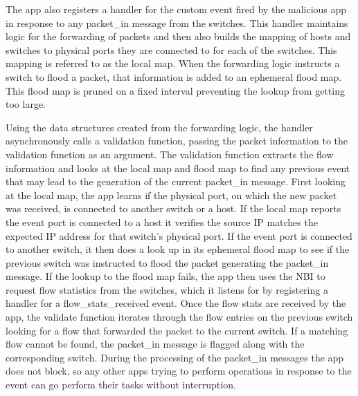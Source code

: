 The app also registers a handler for the custom event fired by the 
malicious app in response to any packet\_in message from the switches. 
This handler maintains logic for the forwarding of packets and then also
builds the mapping of hosts and switches to physical ports they are 
connected to for each of the switches. This mapping is referred to as 
the local map. When the forwarding logic instructs a switch to flood a
packet, that information is added to an ephemeral flood map. This flood
map is pruned on a fixed interval preventing the lookup from getting too
large.

Using the data structures created from the forwarding logic, the handler 
asynchronously calls a validation function, passing the packet information
to the validation function as an argument. The validation function 
extracts the flow information and looks at the local map and flood map to 
find any previous event that may lead to the generation of the current 
packet\_in message. First looking at the local map, the app learns if
the physical port, on which the new packet was received, is connected to
another switch or a host. If the local map reports the event port is 
connected to a host it verifies the source IP matches the expected IP
address for that switch's physical port. If the event port is connected
to another switch, it then does a look up in its ephemeral flood map to 
see if the previous switch was instructed to flood the packet generating
the packet\_in message. If the lookup to the flood map fails, the app then 
uses the NBI to request flow statistics from the switches, which it
listens for by registering a handler for a flow\_stats\_received event.
Once the flow stats are received by the app, the validate function
iterates through the flow entries on the previous switch looking for a 
flow that forwarded the packet to the current switch. If a matching flow
cannot be found, the packet\_in message is flagged along with the 
corresponding switch. During the processing of the packet\_in messages
the app does not block, so any other apps trying to perform operations
in response to the event can go perform their tasks without interruption.
